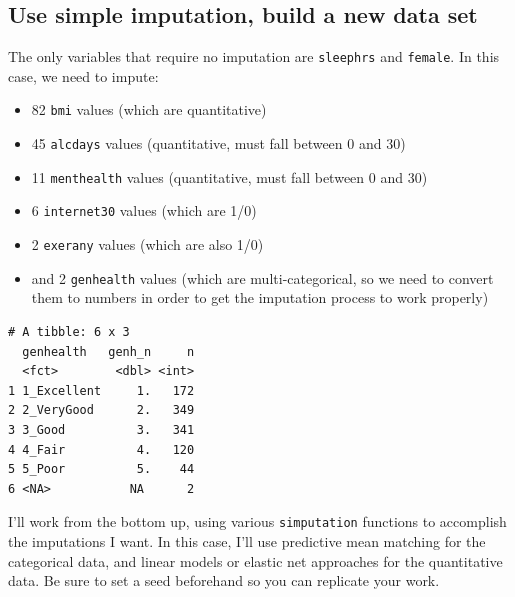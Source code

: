 \documentclass[]{book}
\newenvironment{Shaded}{\begin{snugshade}}{\end{snugshade}}
\newcommand{\KeywordTok}[1]{\textcolor[rgb]{0.13,0.29,0.53}{\textbf{#1}}}
\newcommand{\DataTypeTok}[1]{\textcolor[rgb]{0.13,0.29,0.53}{#1}}
\newcommand{\StringTok}[1]{\textcolor[rgb]{0.31,0.60,0.02}{#1}}
\newcommand{\OperatorTok}[1]{\textcolor[rgb]{0.81,0.36,0.00}{\textbf{#1}}}
\newcommand{\NormalTok}[1]{#1}
\providecommand{\tightlist}{%
  \setlength{\itemsep}{0pt}\setlength{\parskip}{0pt}}
\theoremstyle{definition}
\theoremstyle{definition}
\theoremstyle{definition}
\theoremstyle{remark}
\begin{document}
\subsection{Use simple imputation, build a new data
set}\label{use-simple-imputation-build-a-new-data-set-1}

The only variables that require no imputation are \texttt{sleephrs} and
\texttt{female}. In this case, we need to impute:

\begin{itemize}
\tightlist
\item
  82 \texttt{bmi} values (which are quantitative)
\item
  45 \texttt{alcdays} values (quantitative, must fall between 0 and 30)
\item
  11 \texttt{menthealth} values (quantitative, must fall between 0 and
  30)
\item
  6 \texttt{internet30} values (which are 1/0)
\item
  2 \texttt{exerany} values (which are also 1/0)
\item
  and 2 \texttt{genhealth} values (which are multi-categorical, so we
  need to convert them to numbers in order to get the imputation process
  to work properly)
\end{itemize}

\begin{Shaded}
\end{Shaded}

\begin{verbatim}
# A tibble: 6 x 3
  genhealth   genh_n     n
  <fct>        <dbl> <int>
1 1_Excellent     1.   172
2 2_VeryGood      2.   349
3 3_Good          3.   341
4 4_Fair          4.   120
5 5_Poor          5.    44
6 <NA>           NA      2
\end{verbatim}

I'll work from the bottom up, using various \texttt{simputation}
functions to accomplish the imputations I want. In this case, I'll use
predictive mean matching for the categorical data, and linear models or
elastic net approaches for the quantitative data. Be sure to set a seed
beforehand so you can replicate your work.
\end{document}
